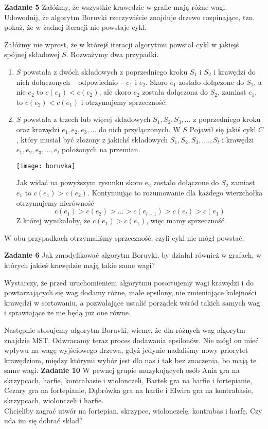\documentclass[12pt,a4paper]{article}
\begin{document}
\newpage
\noindent
\textbf{Zadanie 5} Załóżmy, że wszystkie krawędzie w grafie mają różne wagi. Udowodnij, że algorytm Boruvki rzeczywiście znajduje drzewo rozpinające, tzn. pokaż, że w żadnej iteracji nie powstaje cykl.
\vskip 0.5cm

Załóżmy nie wprost, że w którejś iteracji algorytmu powstał cykl w jakiejś spójnej składowej \(S\). Rozważymy dwa przypadki.

\begin{enumerate}
	\item \(S\) powstała z dwóch składowych z poprzedniego kroku \(S_1\) i \(S_2\) i krawędzi do 		nich dołączonych -- odpowiednio -- \(e_1\) i \(e_2\). Skoro \(e_1\) zostało dołączone do 
	\(S_1\), a	 nie \( e_2 \) to  \( c(e_1) < c(e_2) \), ale skoro \(e_2\) została dołączona do 
	\(S_2\), zamiast \(e_1\), to \( c(e_2) < c(e_1) \) i otrzymujemy sprzeczność.
	\item \(S\) powstała z trzech lub więcej składowych \(S_1, S_2, S_3, ... \) z poprzedniego
	kroku oraz krawędzi \( e_1, e_2, e_3, ... \) do nich przyłączonych. W \(S\) Pojawił się jakiś 
	cykl \(C\), który musiał być złożony z jakichś składowych \(S_1, S_2, S_3, ...., S_l\) i 		
	krawędzi \( e_1, e_2, e_3, ..., e_l \) położonych na przemian.
	\begin{center}
		\texttt{[image: boruvka]} 
	\end{center}
	Jak widać na powyższym rysunku skoro \( e_2 \) zostało dołączone do \(S_2\) zamiast \(e_1\) to 
	\(c(e_1) > c(e_2)\). Kontynuując to rozumowanie dla każdego wierzchołka otrzymujemy nierówność
	\[ c(e_1) > c(e_2) > ... > c(e_{l-1}) > c(e_l) > c(e_1) \]
	Z której wynikałoby, że \( c(e_1) > c(e_1) \), więc mamy sprzeczność.
\end{enumerate}

W obu przypadkach otrzymaliśmy sprzeczność, czyli cykl nie mógł powstać.

\newpage
\noindent
\textbf{Zadanie 6} Jak zmodyfikować algorytm Boruvki, by działał również w grafach, w których jakieś krawędzie mają takie same wagi?
\vskip 0.5cm

Wystarczy, że przed uruchomieniem algorytmu posortujemy wagi krawędzi i do powtarzających się wag
dodamy różne, małe epsilony, nie zmieniające kolejności krawędzi w sortowaniu, a pozwalające ustalić porządek wśród takich samych wag i sprawiające że nie będą już one równe.

Następnie stosujemy algorytm Boruvki, wiemy, że dla różnych wag algorytm znajdzie MST. Odwracamy teraz proces dodawania epsilonów. Nie mógł on mieć wpływu na wagę wyjściowego drzewa, gdyż jedynie nadaliśmy nowy priorytet krawędziom, między którymi wybór jest dla nas i tak bez znaczenia, bo mają te same wagi.
\vskip 0.5cm
\noindent
\textbf{Zadanie 10} W pewnej grupie muzykujących osób Ania gra na skrzypcach, harfie, kontrabasie i wiolonczeli, Bartek gra na harfie i fortepianie, Cezary gra na fortepianie, Dąbrówka gra na harfie i Elwira gra na kontrabasie, skrzypcach, wiolonczeli i harfie. \\
Chcieliby zagrać utwór na fortepian, skrzypce, wiolonczelę, kontrabas i harfę. Czy uda im się dobrać skład?
\vskip 0.5cm
\end{document}
